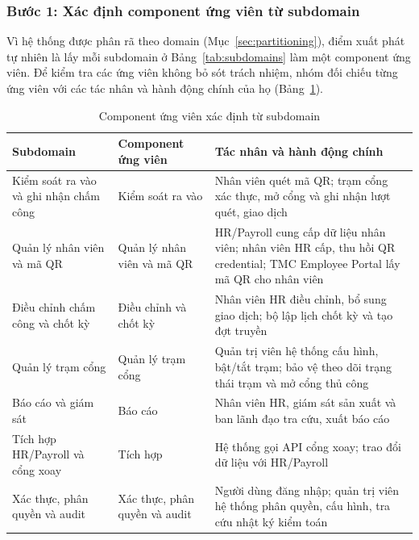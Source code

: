 \subsubsection{Bước 1: Xác định component ứng viên từ subdomain}\label{sec:logical-step1}
Vì hệ thống được phân rã theo domain (Mục~\ref{sec:partitioning}), điểm xuất phát tự nhiên là lấy mỗi subdomain ở Bảng~\ref{tab:subdomains} làm một component ứng viên. Để kiểm tra các ứng viên không bỏ sót trách nhiệm, nhóm đối chiếu từng ứng viên với các tác nhân và hành động chính của họ (Bảng~\ref{tab:candidate-components}).

\begin{table}[H]
\centering
\caption{Component ứng viên xác định từ subdomain}\label{tab:candidate-components}
\small
\renewcommand{\arraystretch}{1.3}
\begin{tabularx}{\textwidth}{|>{\raggedright\arraybackslash}p{4cm}|>{\raggedright\arraybackslash}p{3.6cm}|>{\raggedright\arraybackslash}X|}
\hline
\textbf{Subdomain} & \textbf{Component ứng viên} & \textbf{Tác nhân và hành động chính} \\
\hline
Kiểm soát ra vào và ghi nhận chấm công & Kiểm soát ra vào & Nhân viên quét mã QR; trạm cổng xác thực, mở cổng và ghi nhận lượt quét, giao dịch \\
\hline
Quản lý nhân viên và mã QR & Quản lý nhân viên và mã QR & HR/Payroll cung cấp dữ liệu nhân viên; nhân viên HR cấp, thu hồi QR credential; TMC Employee Portal lấy mã QR cho nhân viên \\
\hline
Điều chỉnh chấm công và chốt kỳ & Điều chỉnh và chốt kỳ & Nhân viên HR điều chỉnh, bổ sung giao dịch; bộ lập lịch chốt kỳ và tạo đợt truyền \\
\hline
Quản lý trạm cổng & Quản lý trạm cổng & Quản trị viên hệ thống cấu hình, bật/tắt trạm; bảo vệ theo dõi trạng thái trạm và mở cổng thủ công \\
\hline
Báo cáo và giám sát & Báo cáo & Nhân viên HR, giám sát sản xuất và ban lãnh đạo tra cứu, xuất báo cáo \\
\hline
Tích hợp HR/Payroll và cổng xoay & Tích hợp & Hệ thống gọi API cổng xoay; trao đổi dữ liệu với HR/Payroll \\
\hline
Xác thực, phân quyền và audit & Xác thực, phân quyền và audit & Người dùng đăng nhập; quản trị viên hệ thống phân quyền, cấu hình, tra cứu nhật ký kiểm toán \\
\hline
\end{tabularx}
\end{table}

